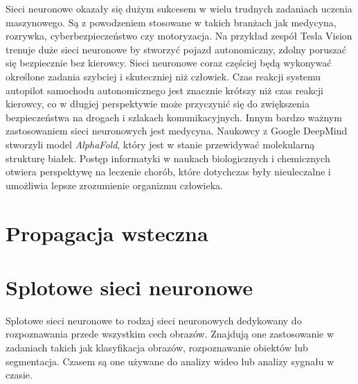Sieci neuronowe okazały się dużym sukcesem w wielu trudnych zadaniach uczenia maszynowego.
Są z powodzeniem stosowane w takich branżach jak medycyna, rozrywka, cyberbezpieczeństwo czy motoryzacja. Na przykład zespół Tesla Vision trenuje duże sieci neuronowe by stworzyć pojazd autonomiczny, zdolny poruszać się bezpiecznie bez kierowcy.
Sieci neuronowe coraz częściej będą wykonywać określone zadania szybciej i skuteczniej niż człowiek.
Czas reakcji systemu autopilot samochodu autonomicznego jest znacznie krótszy niż czas reakcji kierowcy, co w długiej perspektywie może przyczynić się do zwiększenia bezpieczeństwa na drogach i szlakach komunikacyjnych.
Innym bardzo ważnym zastosowaniem sieci neuronowych jest medycyna. Naukowcy z Google DeepMind stworzyli model \textit{AlphaFold}, który jest w stanie przewidywać molekularną strukturę białek.
Postęp informatyki w naukach biologicznych i chemicznych otwiera perspektywę na leczenie chorób, które dotychczas były nieuleczalne i umożliwia lepsze zrozumienie organizmu człowieka.

\section{Propagacja wsteczna}


\section{Splotowe sieci neuronowe}

Splotowe sieci neuronowe to rodzaj sieci neuronowych dedykowany do rozpoznawania przede wszystkim cech obrazów.
Znajdują one zastosowanie w zadaniach takich jak klasyfikacja obrazów, rozpoznawanie obiektów lub segmentacja.
Czasem są one używane do analizy wideo lub analizy sygnału w czasie.

